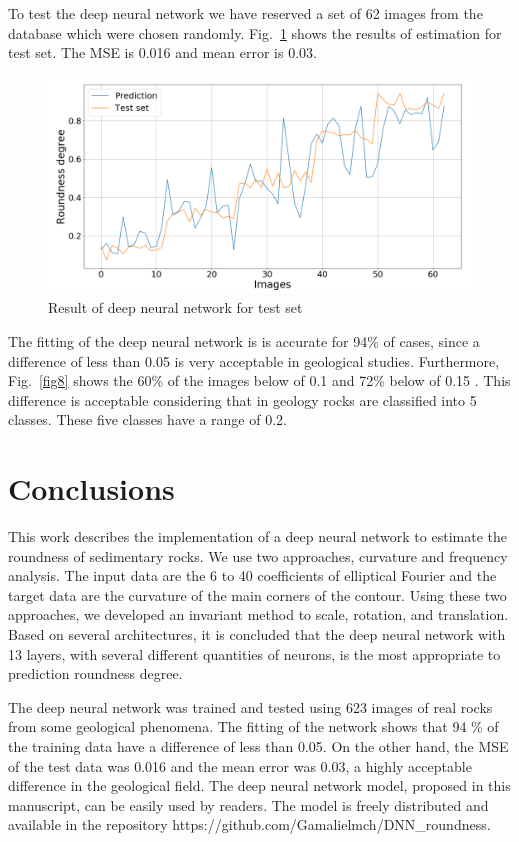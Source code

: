 \documentclass[conference]{IEEEtran}
\begin{document}
To test the deep neural network we have reserved a set of 62 images from the database which were chosen randomly. Fig.~\ref{fig9} shows the results of estimation for test set. The MSE is 0.016 and mean error is 0.03.

\begin{figure}[htbp]
	\centerline{\includegraphics[scale=0.3]{fig9.png}}
	\caption{Result of deep neural network for test set}
	\label{fig9}
\end{figure}

The fitting of the deep neural network is  is accurate for 94\% of cases, since a difference of less than 0.05 is very acceptable in geological studies. Furthermore, Fig.~\ref{fig8} shows the 60\% of the images below of 0.1 and 72\% below of 0.15 . This difference is acceptable considering that in geology rocks are classified into 5 classes. These five classes have a range of 0.2.

\section{Conclusions}
This work describes the implementation of a deep neural network to estimate the roundness of sedimentary rocks. We use two approaches, curvature and frequency analysis. The input data are the 6 to 40 coefficients of elliptical Fourier and the target data are the curvature of the main corners of the contour. Using these two approaches, we developed an invariant method to scale, rotation, and translation. Based on several architectures, it is concluded that the deep neural network with 13 layers, with several different quantities of neurons, is the most appropriate to prediction roundness degree. 

The deep neural network was trained and tested using 623 images of real rocks from some geological phenomena. The fitting of the network shows that 94 \% of the training data have a difference of less than 0.05. On the other hand, the MSE of the test data was 0.016 and the mean error was 0.03, a highly acceptable difference in the geological field. The deep neural network model, proposed in this manuscript, can be easily used by readers. The model is freely distributed and available in the repository https://github.com/Gamalielmch/DNN\_roundness.
\end{document}
